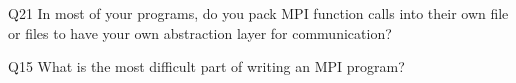 \begin{description}%
\item{Q21} In most of your programs, do you pack MPI function calls into their own file or files to have your own abstraction layer for communication?%
\item{Q15} What is the most difficult part of writing an MPI program?%
\end{description}%
